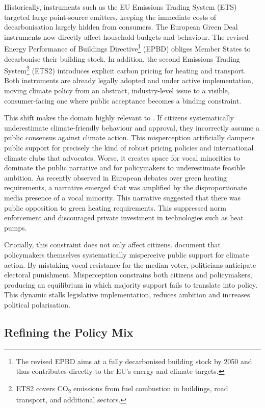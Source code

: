 \documentclass[11pt,a4paper]{scrartcl}
\numberwithin{equation}{section}
\theoremstyle{definition}
\theoremstyle{remark}
\begin{document}
    Historically, instruments such as the EU Emissions Trading System (ETS) targeted large point-source emitters, keeping the immediate costs of decarbonisation largely hidden from consumers. The European Green Deal instruments now directly affect household budgets and behaviour. The revised Energy Performance of Buildings Directive\footnote{The revised EPBD aims at a fully decarbonised building stock by 2050 and thus contributes directly to the EU's energy and climate targets.} (EPBD) obliges Member States to decarbonise their building stock. In addition, the second Emissions Trading System\footnote{ETS2 covers CO\textsubscript{2} emissions from fuel combustion in buildings, road transport, and additional sectors.} (ETS2) introduces explicit carbon pricing for heating and transport. Both instruments are already legally adopted and under active implementation, moving climate policy from an abstract, industry-level issue to a visible, consumer-facing one where public acceptance becomes a binding constraint.

    This shift makes the domain highly relevant to \textcite{andre2024}. If citizens systematically underestimate climate-friendly behaviour and approval, they incorrectly assume a public consensus against climate action. This misperception artificially dampens public support for precisely the kind of robust pricing policies and international climate clubs that \textcite{ockenfels2023_ECONtributePB52} advocates. Worse, it creates space for vocal minorities to dominate the public narrative and for policymakers to underestimate feasible ambition. As recently observed in European debates over green heating requirements, a narrative emerged that was amplified by the disproportionate media presence of a vocal minority. This narrative suggested that there was public opposition to green heating requirements. This suppressed norm enforcement and discouraged private investment in technologies such as heat pumps. 

    Crucially, this constraint does not only affect citizens. \textcite{Mildenberger2019} document that policymakers themselves systematically misperceive public support for climate action. By mistaking vocal resistance for the median voter, politicians anticipate electoral punishment. Misperception constrains both citizens and policymakers, producing an equilibrium in which majority support fails to translate into policy. This dynamic stalls legislative implementation, reduces ambition and increases political polarisation.

\subsection{Refining the Policy Mix}
\label{subsec:Refining the Policy Mix}
\end{document}
